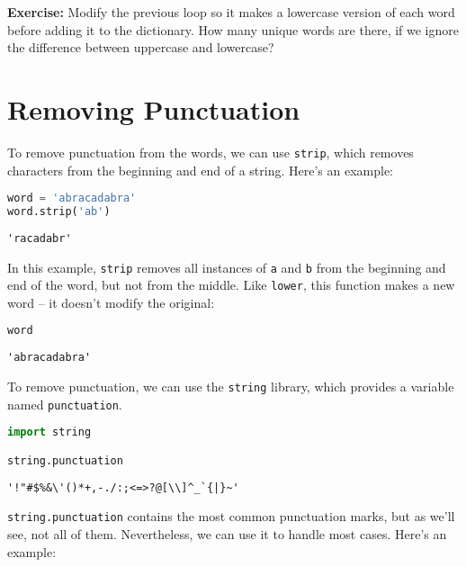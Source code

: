 \textbf{Exercise:} Modify the previous loop so it makes a lowercase
version of each word before adding it to the dictionary. How many unique
words are there, if we ignore the difference between uppercase and
lowercase?

\section{Removing Punctuation}\label{removing-punctuation}

To remove punctuation from the words, we can use
\passthrough{\lstinline!strip!}, which removes characters from the
beginning and end of a string. Here's an example:

\begin{lstlisting}[language=Python,style=source]
word = 'abracadabra'
word.strip('ab')
\end{lstlisting}

\begin{lstlisting}[style=output]
'racadabr'
\end{lstlisting}

In this example, \passthrough{\lstinline!strip!} removes all instances
of \passthrough{\lstinline!a!} and \passthrough{\lstinline!b!} from the
beginning and end of the word, but not from the middle. Like
\passthrough{\lstinline!lower!}, this function makes a new word -- it
doesn't modify the original:

\begin{lstlisting}[language=Python,style=source]
word
\end{lstlisting}

\begin{lstlisting}[style=output]
'abracadabra'
\end{lstlisting}

To remove punctuation, we can use the \passthrough{\lstinline!string!}
library, which provides a variable named
\passthrough{\lstinline!punctuation!}.

\begin{lstlisting}[language=Python,style=source]
import string

string.punctuation
\end{lstlisting}

\begin{lstlisting}[style=output]
'!"#$%&\'()*+,-./:;<=>?@[\\]^_`{|}~'
\end{lstlisting}

\passthrough{\lstinline!string.punctuation!} contains the most common
punctuation marks, but as we'll see, not all of them. Nevertheless, we
can use it to handle most cases. Here's an example:

